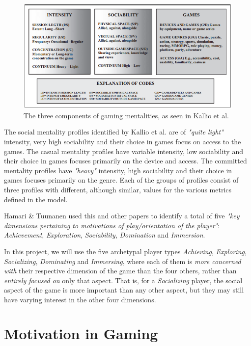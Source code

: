 \begin{figure}[h]
	\centering
	\includegraphics[width=\textwidth]{Figures/kallio-gaming-mentalities-model}
	\caption{The three components of gaming mentalities, as seen in Kallio et al. \cite{kallio2011gamermentalities}}
	\label{fig:kallio-gamer-mentalities-model}
\end{figure}

The social mentality profiles identified by Kallio et al. are of \emph{"quite light"} intensity, very high sociability and their choice in games focus on access to the games. The casual mentality profiles have variable intensity, low sociability and their choice in games focuses primarily on the device and access. The committed mentality profiles have \emph{"heavy"} intensity, high sociability and their choice in games focuses primarily on the genre. Each of the groups of profiles consist of three profiles with different, although similar, values for the various metrics defined in the model.

Hamari \& Tuunanen \cite{hamari2014playertypes} used this and other papers to identify a total of five \emph{"key dimensions pertaining to motivations of play/orientation of the player"}: \emph{Achievement}, \emph{Exploration}, \emph{Sociability}, \emph{Domination} and \emph{Immersion}.

In this project, we will use the five archetypal player types \emph{Achieving}, \emph{Exploring}, \emph{Socializing}, \emph{Dominating} and \emph{Immersing}, where each of them is \emph{more concerned with} their respective dimension of the game than the four others, rather than \emph{entirely focused on} only that aspect. That is, for a \emph{Socializing} player, the social aspect of the game is more important than any other aspect, but they may still have varying interest in the other four dimensions.

\section{Motivation in Gaming}
\label{sec:motivation-in-gaming}

